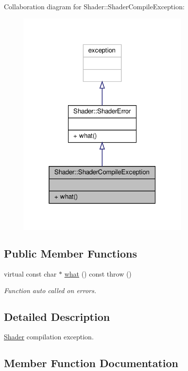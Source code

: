 Collaboration diagram for Shader\+:\+:Shader\+Compile\+Exception\+:
\nopagebreak
\begin{figure}[H]
\begin{center}
\leavevmode
\includegraphics[width=244pt]{class_shader_1_1_shader_compile_exception__coll__graph}
\end{center}
\end{figure}
\subsection*{Public Member Functions}
\begin{DoxyCompactItemize}
\item 
virtual const char $\ast$ \hyperlink{class_shader_1_1_shader_compile_exception_a519cca6165fcabbe8bbd269bb4b22153}{what} () const  throw ()
\begin{DoxyCompactList}\small\item\em Function auto called on errors. \end{DoxyCompactList}\end{DoxyCompactItemize}


\subsection{Detailed Description}
\hyperlink{class_shader}{Shader} compilation exception. 

\subsection{Member Function Documentation}
\mbox{\label{class_shader_1_1_shader_compile_exception_a519cca6165fcabbe8bbd269bb4b22153}} 
